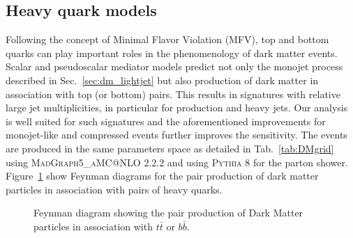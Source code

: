 

\clearpage \subsection{Heavy quark models} \label{sec:dm_heavyjet}

Following the concept of Minimal Flavor Violation (MFV), top and bottom quarks
can play important roles in the phenomenology of dark matter events.  Scalar and
pseudoscalar mediator models predict not only the monojet process described in
Sec.~\ref{sec:dm_lightjet} but also production of dark matter in association
with top (or bottom) pairs. This results in signatures with relative large jet
multiplicities, in particular for \DMtt production and heavy jets. Our \alphat
analysis is well suited for such signatures and the aforementioned improvements
for monojet-like and compressed events further improves the sensitivity. The
events are produced in the same parameters space as detailed in
Tab.~\ref{tab:DMgrid} using \textsc{MadGraph5\_aMC@NLO} 2.2.2 and using
\textsc{Pythia 8} for the parton shower. Figure~\ref{fig:feynman_hf} show
Feynman diagrams for the pair production of dark matter particles in association
with pairs of heavy quarks.


\begin{figure}[h!] \centering
{}
\caption{Feynman diagram showing the pair production of Dark Matter particles in
association with $t\bar{t}$ or $b\bar{b}$. \cite{Abercrombie:2015wmb}}
\label{fig:feynman_hf} \end{figure}


